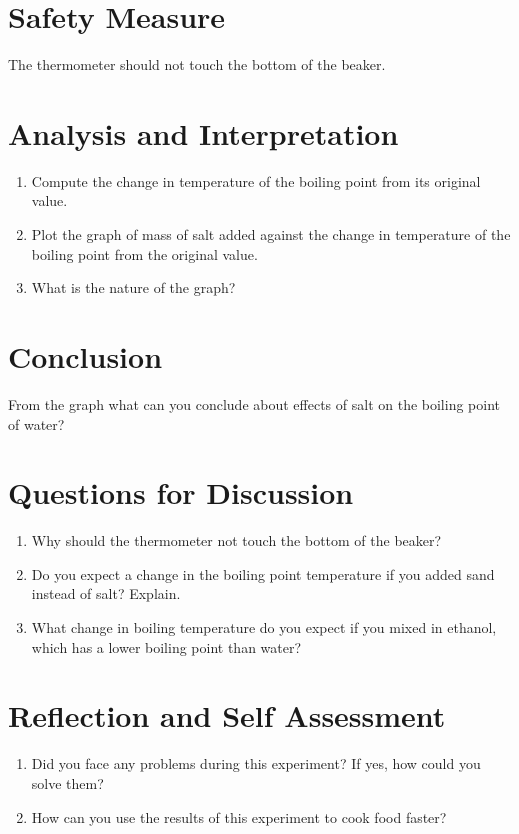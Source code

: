 
\section{Safety Measure}
The thermometer should not touch the bottom of the beaker.

\section{Analysis and Interpretation}
\begin{enumerate}
\item Compute the change in temperature of the boiling point from its original value.
\item Plot the graph of mass of salt added against the change in temperature of the boiling point from the original value.
\item What is the nature of the graph?
\end{enumerate}

\section{Conclusion}
From the graph what can you conclude about effects of salt on the boiling point of water?

\section{Questions for Discussion}
\begin{enumerate}
\item Why should the thermometer not touch the bottom of the beaker?
\item Do you expect a change in the boiling point temperature if you added sand instead of salt? Explain.
\item What change in boiling temperature do you expect if you mixed in ethanol, which has a lower boiling point than water?
\end{enumerate}

\section{Reflection and Self Assessment}
\begin{enumerate}
\item Did you face any problems during this experiment? If yes, how could you solve them?
\item How can you use the results of this experiment to cook food faster?
\end{enumerate}